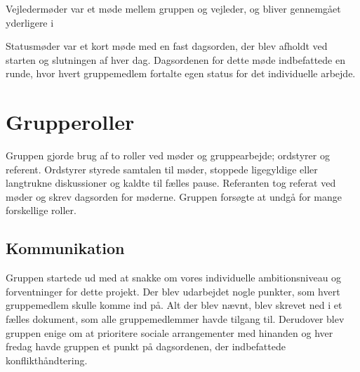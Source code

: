 Vejledermøder var et møde mellem gruppen og vejleder, og bliver gennemgået yderligere i 

Statusmøder var et kort møde med en fast dagsorden, der blev afholdt ved starten og slutningen af hver dag. Dagsordenen for dette møde indbefattede en runde, hvor hvert gruppemedlem fortalte egen status for det individuelle arbejde.

\section{Grupperoller}
Gruppen gjorde brug af to roller ved møder og gruppearbejde; ordstyrer og referent. Ordstyrer styrede samtalen til møder, stoppede ligegyldige
eller langtrukne diskussioner og kaldte til fælles pause. Referanten tog referat ved møder og skrev dagsorden for møderne. Gruppen forsøgte at undgå for mange forskellige roller.

\subsection{Kommunikation}
Gruppen startede ud med at snakke om vores individuelle ambitionsniveau og forventninger for dette projekt. Der blev udarbejdet nogle punkter, som hvert gruppemedlem skulle komme ind på. Alt der blev nævnt, blev skrevet ned i et fælles dokument, som alle gruppemedlemmer havde tilgang til. Derudover blev gruppen enige om at prioritere sociale arrangementer med hinanden og hver fredag havde gruppen et punkt på dagsordenen, der indbefattede konflikthåndtering. 
